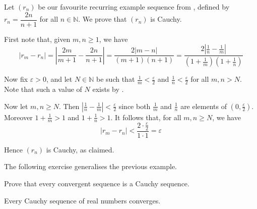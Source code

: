 \begin{example}
\label{exTwoNOverNPlusOneConvergenceYetYetAgain}
Let $(r_n)$ be our favourite recurring example sequence from , defined by $r_n = \dfrac{2n}{n+1}$ for all $n \in \mathbb{N}$. We prove that $(r_n)$ is Cauchy.

First note that, given $m,n \ge 1$, we have
\[ |r_m - r_n| = \left| \frac{2m}{m+1} - \frac{2n}{n+1} \right| = \frac{2 |m-n|}{(m+1)(n+1)} = \frac{2 |\frac{1}{n} - \frac{1}{m}|}{(1+\frac{1}{m})(1+\frac{1}{n})} \]

Now fix $\varepsilon > 0$, and let $N \in \mathbb{N}$ be such that $\frac{1}{m} < \frac{\varepsilon}{2}$ and $\frac{1}{n} < \frac{\varepsilon}{2}$ for all $m,n > N$. Note that such a value of $N$ exists by .

Now let $m,n \ge N$. Then $|\frac{1}{n} - \frac{1}{m}| < \frac{\varepsilon}{2}$ since both $\frac{1}{m}$ and $\frac{1}{n}$ are elements of $(0,\frac{\varepsilon}{2})$. Moreover $1 + \frac{1}{m} > 1$ and $1 + \frac{1}{n} > 1$. It follows that, for all $m,n \ge N$, we have
\[ |r_m - r_n| < \frac{2 \cdot \frac{\varepsilon}{2}}{1 \cdot 1} = \varepsilon \]

Hence $(r_n)$ is Cauchy, as claimed.
\end{example}

The following exercise generalises the previous example.

\begin{exercise}
Prove that every convergent sequence is a Cauchy sequence.
\end{exercise}

\begin{theorem}
\label{thmCauchyImpliesConvergent}
Every Cauchy sequence of real numbers converges.
\end{theorem}

